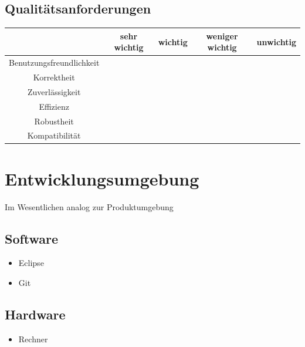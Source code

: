 \documentclass[a4paper,10pt]{scrartcl}
\begin{document}
\subsection{Qualitätsanforderungen}

\begin{tabular}{|c|c|c|c|c|}
\hline
 & \sffamily \textbf{sehr wichtig}
 & \sffamily \textbf{wichtig}
 & \sffamily \textbf{weniger wichtig}
 & \sffamily \textbf{unwichtig} \\
\hline
Benutzungsfreundlichkeit &  &  \X & & \\
\hline
Korrektheit &  \X & & &  \\
\hline
Zuverlässigkeit &  \X & & & \\
\hline
Effizienz &   \X & & & \\
\hline
Robustheit &  & & &\\
\hline
Kompatibilität &  & & & \\
\hline
\end{tabular}

\section{Entwicklungsumgebung}
Im Wesentlichen analog zur Produktumgebung

\subsection{Software}
\begin{itemize}
\item Eclipse
\item Git
\end{itemize}
\subsection{Hardware}
\begin{itemize}
\item Rechner
\end{itemize}


\clearpage


{}

\end{document}
